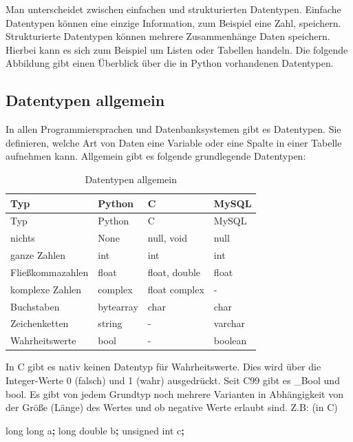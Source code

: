 \documentclass[
]{book}
\newenvironment{Shaded}{\begin{snugshade}}{\end{snugshade}}
\newcommand{\BuiltInTok}[1]{#1}
\newcommand{\NormalTok}[1]{#1}
\newcommand{\OperatorTok}[1]{\textcolor[rgb]{0.81,0.36,0.00}{\textbf{#1}}}
\begin{document}
Man unterscheidet zwischen einfachen und strukturierten Datentypen. Einfache Datentypen können eine einzige Information, zum Beispiel eine Zahl, speichern. Strukturierte Datentypen können mehrere Zusammenhänge Daten speichern. Hierbei kann es sich zum Beispiel um Listen oder Tabellen handeln. Die folgende Abbildung gibt einen Überblick über die in Python vorhandenen Datentypen.

\hypertarget{datentypen-allgemein}{%
\subsection*{Datentypen allgemein}\label{datentypen-allgemein}}

In allen Programmiersprachen und Datenbanksystemen gibt es Datentypen. Sie definieren, welche Art von Daten eine Variable oder eine Spalte in einer Tabelle aufnehmen kann. Allgemein gibt es folgende grundlegende Datentypen:

\begin{longtable}[]{@{}llll@{}}
\caption{Datentypen allgemein}\tabularnewline
\toprule()
Typ & Python & C & MySQL \\
\midrule()
\endfirsthead
\toprule()
Typ & Python & C & MySQL \\
\midrule()
\endhead
nichts & None & null, void & null \\
ganze Zahlen & int & int & int \\
Fließkommazahlen & float & float, double & float \\
komplexe Zahlen & complex & float complex & - \\
Buchstaben & bytearray & char & char \\
Zeichenketten & string & - & varchar \\
Wahrheitswerte & bool & - & boolean \\
\bottomrule()
\end{longtable}

In C gibt es nativ keinen Datentyp für Wahrheitswerte. Dies wird über die Integer-Werte 0 (falsch) und 1 (wahr) ausgedrückt. Seit C99 gibt es \_Bool und bool. Es gibt von jedem Grundtyp noch mehrere Varianten in Abhängigkeit von der Größe (Länge) des Wertes und ob negative Werte erlaubt sind. Z.B: (in C)

\begin{Shaded}
\begin{Highlighting}[]
\BuiltInTok{long} \BuiltInTok{long}\NormalTok{ a}\OperatorTok{;}
\BuiltInTok{long}\NormalTok{ double b}\OperatorTok{;}
\NormalTok{unsigned }\BuiltInTok{int}\NormalTok{ c}\OperatorTok{;}
\end{Highlighting}
\end{Shaded}
\end{document}
